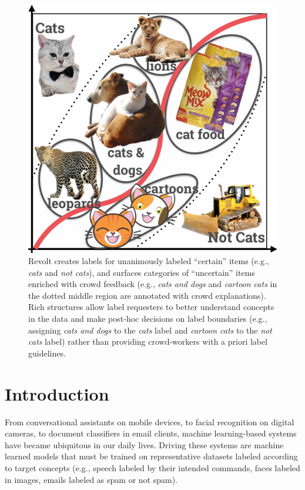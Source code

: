 


\begin{figure}[ht]
	\centering
	\includegraphics[width=0.45\columnwidth]{Chapters/Revolt/figures/bannerCC2.png}
	\caption[A high level view of the Revolt system.]{Revolt creates labels for unanimously labeled ``certain'' items (e.g., \emph{cats} and \emph{not cats}), and surfaces categories of ``uncertain'' items enriched with crowd feedback (e.g., \emph{cats and dogs} and \emph{cartoon cats} in the dotted middle region are annotated with crowd explanations). Rich structures allow label requesters to better understand concepts in the data and make post-hoc decisions on label boundaries (e.g., assigning \emph{cats and dogs} to the \emph{cats} label and \emph{cartoon cats} to the \emph{not cats} label) rather than providing crowd-workers with a priori label guidelines.}
	\label{fig:revolt_workflow}
\end{figure}

\section{Introduction}
From conversational assistants on mobile devices, to facial recognition on digital cameras, to document classifiers in email clients, machine learning-based systems have became ubiquitous in our daily lives. Driving these systems are machine learned models that must be trained on representative datasets labeled according to target concepts (e.g., speech labeled by their intended commands, faces labeled in images, emails labeled as spam or not spam).

